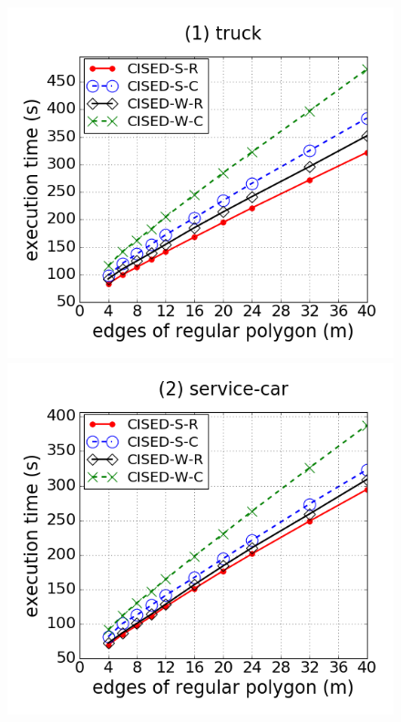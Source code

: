 \begin{figure}[tb!]
\centering
\includegraphics[scale = 0.240]{figures/Exp-M-e-60-time-truck.png}
\includegraphics[scale = 0.240]{figures/Exp-M-e-60-time-service.png}

\end{figure}
